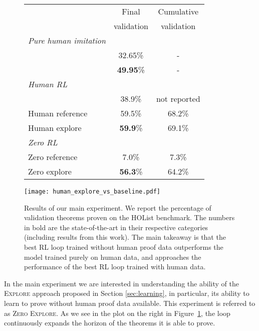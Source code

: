 \documentclass{article}
\begin{document}
\begin{figure}
\centering
\begin{minipage}{0.49\textwidth}
\footnotesize
\begin{tabular}{l|c|c}
                            & Final      & Cumulative\\
                            & validation & validation\\ 
\hline
\emph{Pure human imitation} & & \\
\quad \citet{bansal2019holist}    & 32.65\%    &  - \\
\quad \citet{paliwal2020graph}    & \textbf{49.95}\%    &  - \\
\hline
\emph{Human RL}    & & \\
\quad \citet{bansal2019holist}    & 38.9\%     & not reported \\
\quad Human reference             & 59.5\%    & 68.2\%\\
\quad Human explore               & \textbf{59.9}\%     & 69.1\% \\
\hline
\emph{Zero RL}      & & \\
\quad Zero reference              & 7.0\%      & 7.3\% \\
\quad Zero explore                & \textbf{56.3}\%     & 64.2\% \\
\end{tabular}
\end{minipage}
\begin{minipage}{0.49\textwidth}\centering
    \texttt{[image: human\_explore\_vs\_baseline.pdf]}
\end{minipage}
\vspace{-2mm}
\caption{Results of our main experiment. We report the percentage of validation theorems proven on the HOList benchmark. The numbers in bold are the state-of-the-art in their respective categories (including results from this work). The main takeaway is that the best RL loop trained without human proof data outperforms the model trained purely on human data, and approaches the performance of the best RL loop trained with human data.}
\label{fig:main}
\vspace{-3mm}
\end{figure}In the main experiment we are interested in understanding the ability of the \textsc{Explore} approach proposed in Section \ref{sec:learning}, in particular, its ability to learn to prove without human proof data available. This experiment is referred to as \textsc{Zero Explore}.
As we see in the plot on the right in Figure~\ref{fig:main}, the loop continuously expands the horizon of the theorems it is able to prove.
\end{document}
